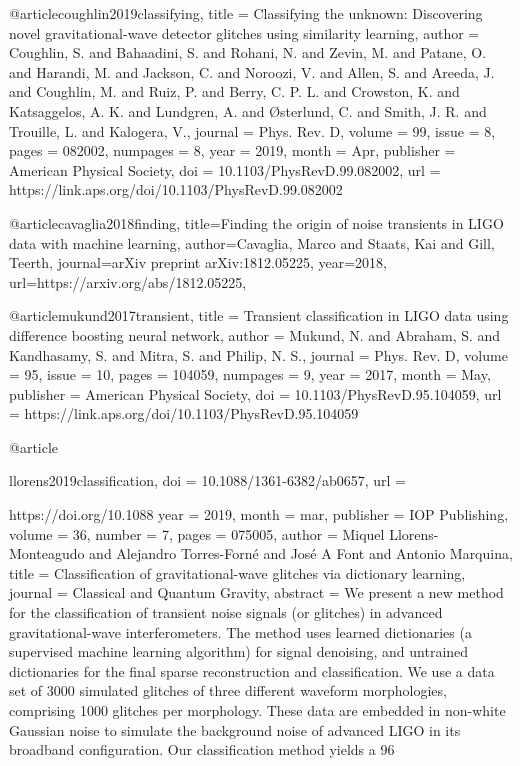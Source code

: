 {{{{{{{@article{coughlin2019classifying,
  title = {Classifying the unknown: Discovering novel gravitational-wave detector glitches using similarity learning},
  author = {Coughlin, S. and Bahaadini, S. and Rohani, N. and Zevin, M. and Patane, O. and Harandi, M. and Jackson, C. and Noroozi, V. and Allen, S. and Areeda, J. and Coughlin, M. and Ruiz, P. and Berry, C. P. L. and Crowston, K. and Katsaggelos, A. K. and Lundgren, A. and \O{}sterlund, C. and Smith, J. R. and Trouille, L. and Kalogera, V.},
  journal = {Phys. Rev. D},
  volume = {99},
  issue = {8},
  pages = {082002},
  numpages = {8},
  year = {2019},
  month = {Apr},
  publisher = {American Physical Society},
  doi = {10.1103/PhysRevD.99.082002},
  url = {https://link.aps.org/doi/10.1103/PhysRevD.99.082002}
}


@article{cavaglia2018finding,
  title={Finding the origin of noise transients in LIGO data with machine learning},
  author={Cavaglia, Marco and Staats, Kai and Gill, Teerth},
  journal={arXiv preprint arXiv:1812.05225},
  year={2018},
  url={https://arxiv.org/abs/1812.05225},
}


@article{mukund2017transient,
  title = {Transient classification in LIGO data using difference boosting neural network},
  author = {Mukund, N. and Abraham, S. and Kandhasamy, S. and Mitra, S. and Philip, N. S.},
  journal = {Phys. Rev. D},
  volume = {95},
  issue = {10},
  pages = {104059},
  numpages = {9},
  year = {2017},
  month = {May},
  publisher = {American Physical Society},
  doi = {10.1103/PhysRevD.95.104059},
  url = {https://link.aps.org/doi/10.1103/PhysRevD.95.104059}
}


@article{llorens2019classification,
	doi = {10.1088/1361-6382/ab0657},
	url = {https://doi.org/10.1088%
	year = 2019,
	month = {mar},
	publisher = {{IOP} Publishing},
	volume = {36},
	number = {7},
	pages = {075005},
	author = {Miquel Llorens-Monteagudo and Alejandro Torres-Forn{\'{e}} and Jos{\'{e}} A Font and Antonio Marquina},
	title = {Classification of gravitational-wave glitches via dictionary learning},
	journal = {Classical and Quantum Gravity},
	abstract = {We present a new method for the classification of transient noise signals (or glitches) in advanced gravitational-wave interferometers. The method uses learned dictionaries (a supervised machine learning algorithm) for signal denoising, and untrained dictionaries for the final sparse reconstruction and classification. We use a data set of 3000 simulated glitches of three different waveform morphologies, comprising 1000 glitches per morphology. These data are embedded in non-white Gaussian noise to simulate the background noise of advanced LIGO in its broadband configuration. Our classification method yields a 96%
}


}}}}}}}}}
